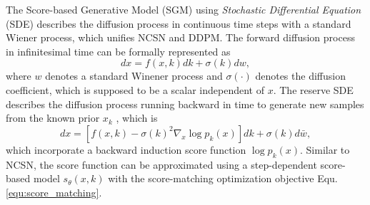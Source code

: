 \documentclass{article} %
\begin{document}
The Score-based Generative Model (SGM) using \textit{Stochastic Differential Equation} (SDE) \cite{song2021scorebased} describes the diffusion process in continuous time steps with a standard Wiener process, which unifies NCSN and DDPM. The forward diffusion process in infinitesimal time can be formally represented as
\begin{equation}
    dx = f(x, k) dk + \sigma(k) dw,
\end{equation}
where $w$ denotes a standard Winener process and $\sigma(\cdot)$ denotes the diffusion coefficient, which is supposed to be a scalar independent of $x$. The reserve SDE describes the diffusion process running backward in time to generate new samples from the known prior $x_k$ \cite{reversesde}, which is
\begin{equation}
    dx = [f(x, k) - \sigma(k)^2 \nabla_x \log p_k(x)] dk + \sigma(k) d\bar{w},
\end{equation}
which incorporate a backward induction score function $\log p_k(x)$. Similar to NCSN, the score function can be approximated using a step-dependent score-based model $s_\theta(x, k)$ with the score-matching optimization objective Equ. \ref{equ:score_matching}.


\clearpage



\end{document}

